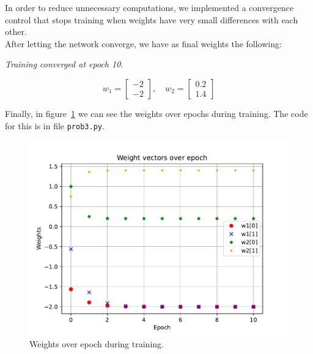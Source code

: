In order to reduce unnecessary computations, we implemented a convergence control that stops training when weights have very small differences with each other.\\

After letting the network converge, we have as final weights the following:
\begin{center}
	\textit{\small Training converged at epoch 10.}
\end{center}
\[
w_1 = \left[
\begin{array}{c}
	-2\\-2
\end{array}
\right], \quad
w_2 = \left[
\begin{array}{c}
	0.2\\1.4
\end{array}
\right]
\] 

Finally, in figure~\ref{fig:prob3_weights_over_epoch} we can see the weights over epochs during training.
The code for this is in file \verb|prob3.py|.

\begin{figure}[htpb]
	\centering
	\includegraphics[width=0.47\linewidth]{../Problem 3/prob3_weights_over_epoch.pdf}
	\caption{Weights over epoch during training.}
	\label{fig:prob3_weights_over_epoch}
\end{figure}
\vspace{3mm}
